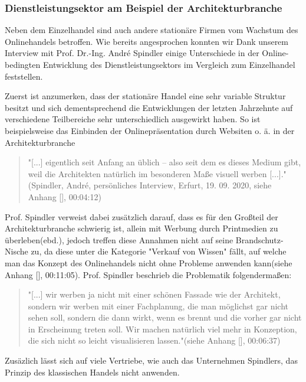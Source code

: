 \begin{folding} \subsubsection{Dienstleistungsektor am Beispiel der Architekturbranche}

Neben dem Einzelhandel sind auch andere stationäre Firmen vom Wachstum des Onlinehandels betroffen. Wie bereits angesprochen konnten wir Dank unserem Interview mit Prof. Dr.-Ing. André Spindler einige Unterschiede in der Online-bedingten Entwicklung des Dienstleistungsektors im Vergleich zum Einzelhandel feststellen.

Zuerst ist anzumerken, dass der stationäre Handel eine sehr variable Struktur besitzt und sich dementsprechend die Entwicklungen der letzten Jahrzehnte auf verschiedene Teilbereiche sehr unterschiedlich ausgewirkt haben. So ist beispielsweise das Einbinden der Onlinepräsentation durch Websiten o. ä. in der Architekturbranche

\begin{quote}
"[...] eigentlich seit Anfang an üblich – also seit dem es dieses Medium gibt, weil die Architekten natürlich im besonderen Maße visuell werben [...]."(Spindler, André, persönliches Interview, Erfurt, 19. 09. 2020, siehe Anhang [], 00:04:12)
\end{quote} 
Prof. Spindler verweist dabei zusätzlich darauf, dass es für den Großteil der Architekturbranche schwierig ist, allein mit Werbung durch Printmedien zu überleben(ebd.), jedoch treffen diese Annahmen nicht auf seine Brandschutz-Nische zu, da diese unter die Kategorie "Verkauf von Wissen" fällt, auf welche man das Konzept des Onlinehandels nicht ohne Probleme anwenden kann(siehe Anhang [], 00:11:05). Prof. Spindler beschrieb die Problematik folgendermaßen:

\begin{quote}
"[...] wir werben ja nicht mit einer schönen Fassade wie der Architekt, sondern wir werben mit einer Fachplanung, die man möglichst gar nicht sehen soll, sondern die dann wirkt, wenn es brennt und die vorher gar nicht in Erscheinung treten soll. Wir machen natürlich viel mehr in Konzeption, die sich nicht so leicht visualisieren lassen."(siehe Anhang [], 00:06:37)
\end{quote} 

Zusäzlich lässt sich auf viele Vertriebe, wie auch das Unternehmen Spindlers, das Prinzip des klassischen Handels nicht anwenden. 


\end{folding}
